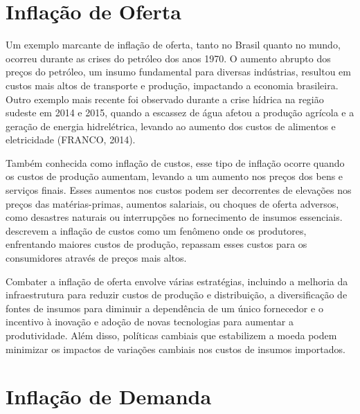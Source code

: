 \documentclass[12pt,oneside,a4paper,chapter=TITLE,english,brazil,sumario=abnt-6027-2012]{abntex2}
\begin{document}

\section{Inflação de Oferta}



Um exemplo marcante de inflação de oferta, tanto no Brasil quanto no mundo, ocorreu durante as crises do petróleo dos anos 1970. O aumento abrupto dos preços do petróleo, um insumo fundamental para diversas indústrias, resultou em custos mais altos de transporte e produção, impactando a economia brasileira. Outro exemplo mais recente foi observado durante a crise hídrica na região sudeste em 2014 e 2015, quando a escassez de água afetou a produção agrícola e a geração de energia hidrelétrica, levando ao aumento dos custos de alimentos e eletricidade (FRANCO, 2014).

Também conhecida como inflação de custos, esse tipo de inflação ocorre quando os custos de produção aumentam, levando a um aumento nos preços dos bens e serviços finais. Esses aumentos nos custos podem ser decorrentes de elevações nos preços das matérias-primas, aumentos salariais, ou choques de oferta adversos, como desastres naturais ou interrupções no fornecimento de insumos essenciais.  descrevem a inflação de custos como um fenômeno onde os produtores, enfrentando maiores custos de produção, repassam esses custos para os consumidores através de preços mais altos.

Combater a inflação de oferta envolve várias estratégias, incluindo a melhoria da infraestrutura para reduzir custos de produção e distribuição, a diversificação de fontes de insumos para diminuir a dependência de um único fornecedor e o incentivo à inovação e adoção de novas tecnologias para aumentar a produtividade. Além disso, políticas cambiais que estabilizem a moeda podem minimizar os impactos de variações cambiais nos custos de insumos importados. 

\section{Inflação de Demanda}
\end{document}
